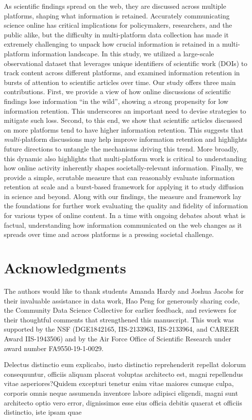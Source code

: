 \documentclass[letterpaper]{article} %
\begin{document}
As scientific findings spread on the web, they are discussed across multiple platforms, shaping what information is retained. Accurately communicating science online has critical implications for policymakers, researchers, and the public alike, but the difficulty in multi-platform data collection has made it extremely challenging to unpack how crucial information is retained in a multi-platform information landscape. In this study, we utilized a large-scale observational dataset that leverages unique identifiers of scientific work (DOIs) to track content across different platforms, and examined information retention in bursts of attention to scientific articles over time. Our study offers three main contributions. First, we provide a view of how online discussions of scientific findings lose information ``in the wild'', showing a strong propensity for low information retention. This underscores an important need to devise strategies to mitigate such loss. Second, to this end, we show that scientific articles discussed on more platforms tend to have higher information retention. This suggests that \textit{multi-}platform discussions may help improve information retention and highlights future directions to untangle the mechanisms driving this trend. More broadly, this dynamic also highlights that multi-platform work is critical to understanding how online activity inherently shapes societally-relevant information. Finally, we provide a simple, scrutable measure that can reasonably evaluate information retention at scale and a burst-based framework for applying it to study diffusion in science and beyond. Along with our findings, the measure and framework lay the foundations for further work evaluating the quality and fidelity of information for various types of online content. In a time with ongoing debates about what is factual, understanding how information communicated on the web changes as it spreads over time and across platforms is a pressing societal challenge.

\section{Acknowledgments}
The authors would like to thank students Amanda Hardy and Joshua Jacobs for their invaluable assistance in data work, Hao Peng for generously sharing code, the Community Data Science Collective for earlier feedback, and reviewers for their thoughtful comments that strengthened this manuscript. This work was supported by the NSF (DGE1842165, IIS-2133963, IIS-2133964, and CAREER Award IIS-1943506) and by the Air Force Office of Scientific Research under award number FA9550-19-1-0029.

Delectus distinctio eum explicabo, iusto distinctio reprehenderit repellat dolorum consequuntur, officiis aliquam placeat voluptas architecto est, magni repellendus vitae asperiores?Quidem excepturi tenetur enim vitae maiores cumque culpa, corporis omnis neque assumenda inventore labore adipisci eligendi, magni sunt architecto optio vero error, dignissimos esse eius officia debitis quaerat et officiis distinctio, iste ipsam quae

\end{document}
